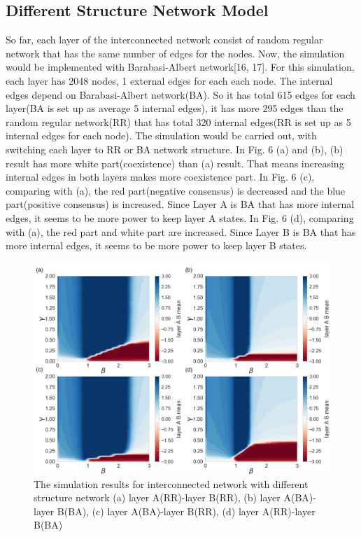 \documentclass[english]{cccconf}
\begin{document}
\subsection{Different Structure Network Model}
So far, each layer of the interconnected network consist of random regular network that has the same number of edges for the nodes. Now, the simulation would be implemented with Barabasi-Albert network[16, 17]. For this simulation, each layer has 2048 nodes, 1 external edges for each each node. The internal edges depend on Barabasi-Albert network(BA). So it has total 615 edges for each layer(BA is set up as average 5 internal edges), it has more 295 edges than the random regular network(RR) that has total 320 internal edges(RR is set up as 5 internal edges for each node). The simulation would be carried out, with switching each layer to RR or BA network structure.
In Fig. 6 (a) and (b), (b) result has more white part(coexistence) than (a) result. That means increasing internal edges in both layers makes more coexistence part.
In Fig. 6 (c), comparing with (a), the red part(negative consensus) is decreased and the blue part(positive consensus) is increased. Since Layer A is BA that has more internal edges, it seems to be more power to keep layer A states.
In Fig. 6 (d), comparing with (a), the red part and white part are increased. Since Layer B is BA that has more internal edges, it seems to be more power to keep layer B states.
\begin{figure}[!htb]
  \centering
  \includegraphics[width=\hsize]{FIG6.png}
  \caption{The simulation results for interconnected network with different structure network (a) layer A(RR)-layer B(RR), (b) layer A(BA)-layer B(BA), (c) layer A(BA)-layer B(RR), (d) layer A(RR)-layer B(BA)}
  \label{Fig6}
\end{figure}
\end{document}
